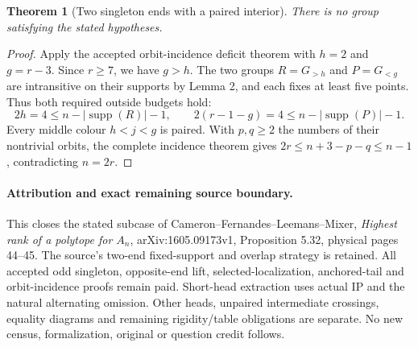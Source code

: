 \documentclass[11pt,a4paper]{article}
\newtheorem{theorem}[lemma]{Theorem}
\begin{document}
\begin{theorem}[Two singleton ends with a paired interior]
There is no group satisfying the stated hypotheses.
\end{theorem}
\begin{proof}
Apply the accepted orbit-incidence deficit theorem with
$h=2$ and $g=r-3$. Since $r\ge7$, we have $g>h$.
The two groups $R=G_{>h}$ and $P=G_{<g}$ are intransitive on
their supports by Lemma 2, and each fixes at least five points.
Thus both required outside budgets hold:
\[
 2h=4\le n-|\operatorname{supp}(R)|-1,\qquad
 2(r-1-g)=4\le n-|\operatorname{supp}(P)|-1.
\]
Every middle colour $h<j<g$ is paired. With $p,q\ge2$ the
numbers of their nontrivial orbits, the complete incidence theorem
gives $2r\le n+3-p-q\le n-1$, contradicting $n=2r$.
\end{proof}

\paragraph{Attribution and exact remaining source boundary.}
This closes the stated subcase of Cameron--Fernandes--Leemans--Mixer,
\emph{Highest rank of a polytope for $A_n$}, arXiv:1605.09173v1,
Proposition 5.32, physical pages 44--45. The source's two-end
fixed-support and overlap strategy is retained. All accepted odd
singleton, opposite-end lift, selected-localization, anchored-tail
and orbit-incidence proofs remain paid. Short-head extraction uses
actual IP and the natural alternating omission. Other heads,
unpaired intermediate crossings, equality diagrams and remaining
rigidity/table obligations are separate. No new census, formalization,
original or question credit follows.
\end{document}
